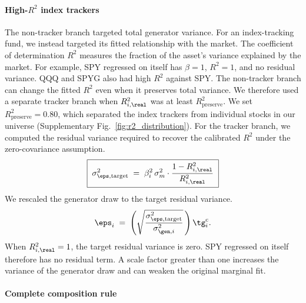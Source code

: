 \paragraph{High-$R^2$ index trackers}

The non-tracker branch targeted total generator variance. For an
index-tracking fund, we instead targeted its fitted relationship with
the market. The coefficient of determination $R^2$ measures the
fraction of the asset's variance explained by the market. For example,
SPY regressed on itself has $\beta=1$, $R^2=1$, and no residual
variance. QQQ and SPYG also had high $R^2$ against SPY. The
non-tracker branch can change the fitted $R^2$ even when it preserves
total variance. We therefore used a separate tracker branch
when $R^2_{i,\real}$ was at least $R^2_{\mathrm{preserve}}$. We set
$R^2_{\mathrm{preserve}}=0.80$, which separated the index trackers from
individual stocks in our universe (Supplementary Fig.~\ref{fig:r2_distribution}).
For the tracker branch, we computed the residual variance required to
recover the calibrated $R^2$ under the zero-covariance assumption.
\begin{equation}
  \boxed{\;\sigma_{\eps,\mathrm{target}}^2 \;=\; \beta_i^2\, \sigma_m^2 \cdot
    \frac{1 - R^2_{i,\real}}{R^2_{i,\real}}\;}
  \label{eq:r2-target}
\end{equation}
We rescaled the generator draw to the target residual variance.
\begin{equation}
  \eps_i \;=\; \left(\sqrt{\frac{\sigma_{\eps,\mathrm{target}}^2}{\sigma_{\gen,i}^2}}\,\right)\tg_i^{\mathrm c}.
  \label{eq:r2-rescale}
\end{equation}
When $R^2_{i,\real}=1$, the target residual variance is zero. SPY
regressed on itself therefore has no residual term. A scale factor
greater than one increases the variance of the generator draw and can
weaken the original marginal fit.

\paragraph{Complete composition rule}

